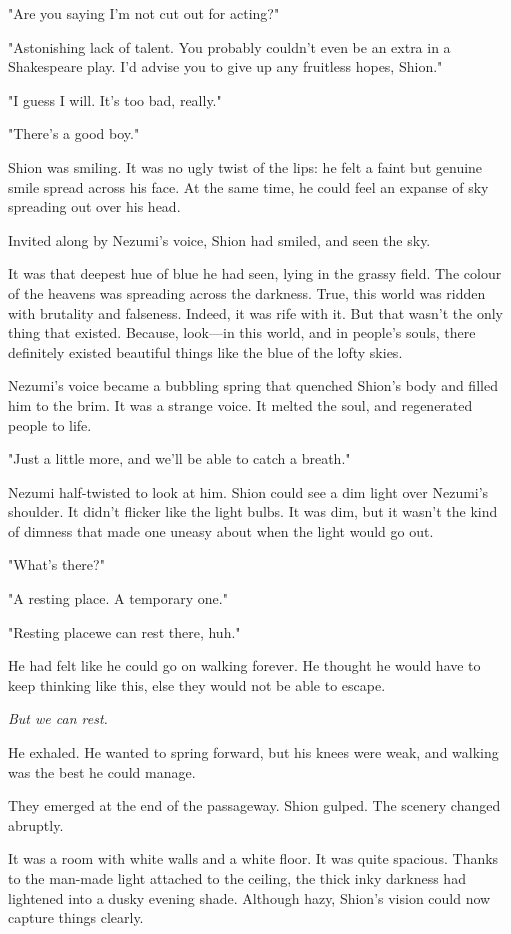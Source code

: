 "Are you saying I'm not cut out for acting?"

"Astonishing lack of talent. You probably couldn't even be an extra in a
Shakespeare play. I'd advise you to give up any fruitless hopes, Shion."

"I guess I will. It's too bad, really."

"There's a good boy."

Shion was smiling. It was no ugly twist of the lips: he felt a faint but
genuine smile spread across his face. At the same time, he could feel an
expanse of sky spreading out over his head.

Invited along by Nezumi's voice, Shion had smiled, and seen the sky.

It was that deepest hue of blue he had seen, lying in the grassy field.
The colour of the heavens was spreading across the darkness. True, this
world was ridden with brutality and falseness. Indeed, it was rife with
it. But that wasn't the only thing that existed. Because, look---in this
world, and in people's souls, there definitely existed beautiful things
like the blue of the lofty skies.

Nezumi's voice became a bubbling spring that quenched Shion's body and
filled him to the brim. It was a strange voice. It melted the soul, and
regenerated people to life.

"Just a little more, and we'll be able to catch a breath."

Nezumi half-twisted to look at him. Shion could see a dim light over
Nezumi's shoulder. It didn't flicker like the light bulbs. It was dim,
but it wasn't the kind of dimness that made one uneasy about when the
light would go out.

"What's there?"

"A resting place. A temporary one."

"Resting place\el we can rest there, huh."

He had felt like he could go on walking forever. He thought he would
have to keep thinking like this, else they would not be able to escape.

\emph{But we can rest.}

He exhaled. He wanted to spring forward, but his knees were weak, and
walking was the best he could manage.

They emerged at the end of the passageway. Shion gulped. The scenery
changed abruptly.

It was a room with white walls and a white floor. It was quite spacious.
Thanks to the man-made light attached to the ceiling, the thick inky
darkness had lightened into a dusky evening shade. Although hazy,
Shion's vision could now capture things clearly.

